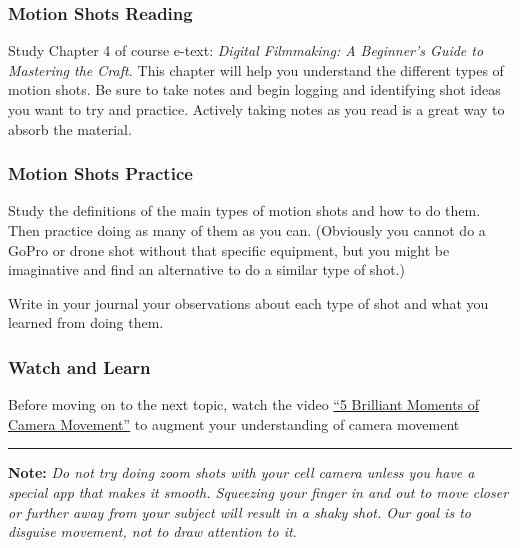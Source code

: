 \documentclass[
]{book}
\begin{document}
\begin{reflect}
\hypertarget{motion-shots-reading}{%
\subsubsection*{Motion Shots Reading}\label{motion-shots-reading}}

Study Chapter 4 of course e-text: \emph{Digital Filmmaking: A Beginner's Guide to Mastering the Craft.} This chapter will help you understand the different types of motion shots. Be sure to take notes and begin logging and identifying shot ideas you want to try and practice. Actively taking notes as you read is a great way to absorb the material.

\hypertarget{motion-shots-practice}{%
\subsubsection*{Motion Shots Practice}\label{motion-shots-practice}}

Study the definitions of the main types of motion shots and how to do them. Then practice doing as many of them as you can. (Obviously you cannot do a GoPro or drone shot without that specific equipment, but you might be imaginative and find an alternative to do a similar type of shot.)

Write in your journal your observations about each type of shot and what you learned from doing them.

\hypertarget{watch-and-learn}{%
\subsubsection*{Watch and Learn}\label{watch-and-learn}}

Before moving on to the next topic, watch the video \href{https://www.youtube.com/watch?v=h2c3JZ6X3f8}{``5 Brilliant Moments of Camera Movement''} to augment your understanding of camera movement

\begin{center}\rule{0.5\linewidth}{0.5pt}\end{center}

\textbf{Note:} \emph{Do not try doing zoom shots with your cell camera unless you have a special app that makes it smooth. Squeezing your finger in and out to move closer or further away from your subject will result in a shaky shot. Our goal is to disguise movement, not to draw attention to it.}
\end{reflect}
\end{document}
